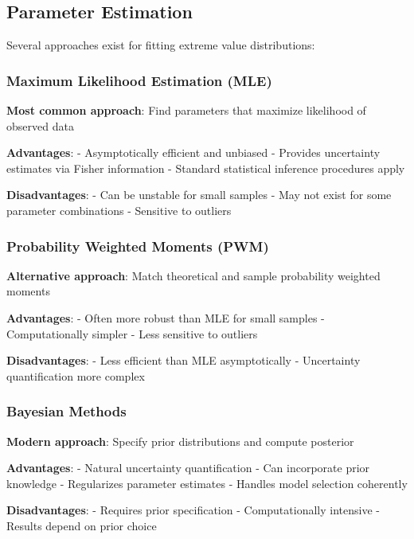 \documentclass[
  letterpaper,
  DIV=11,
  numbers=noendperiod]{scrreprt}
\begin{document}
\subsection{Parameter Estimation}\label{parameter-estimation}

Several approaches exist for fitting extreme value distributions:

\subsubsection{Maximum Likelihood Estimation
(MLE)}\label{maximum-likelihood-estimation-mle}

\textbf{Most common approach}: Find parameters that maximize likelihood
of observed data

\textbf{Advantages}: - Asymptotically efficient and unbiased - Provides
uncertainty estimates via Fisher information - Standard statistical
inference procedures apply

\textbf{Disadvantages}: - Can be unstable for small samples - May not
exist for some parameter combinations - Sensitive to outliers

\subsubsection{Probability Weighted Moments
(PWM)}\label{probability-weighted-moments-pwm}

\textbf{Alternative approach}: Match theoretical and sample probability
weighted moments

\textbf{Advantages}: - Often more robust than MLE for small samples -
Computationally simpler - Less sensitive to outliers

\textbf{Disadvantages}: - Less efficient than MLE asymptotically -
Uncertainty quantification more complex

\subsubsection{Bayesian Methods}\label{bayesian-methods}

\textbf{Modern approach}: Specify prior distributions and compute
posterior

\textbf{Advantages}: - Natural uncertainty quantification - Can
incorporate prior knowledge - Regularizes parameter estimates - Handles
model selection coherently

\textbf{Disadvantages}: - Requires prior specification - Computationally
intensive - Results depend on prior choice
\end{document}
